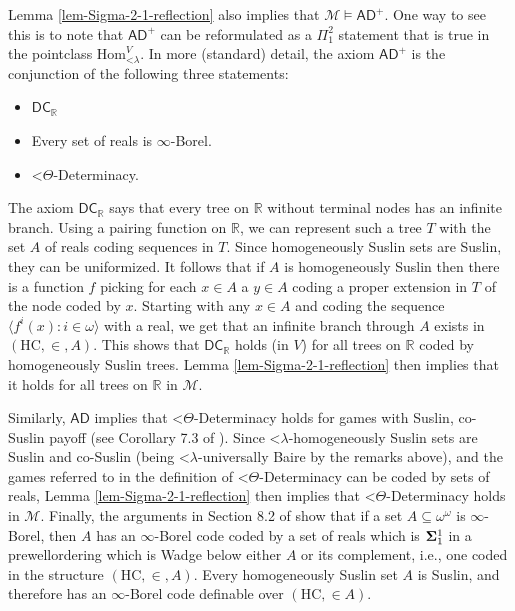 \documentclass[fleqn, 11pt]{amsart}
\theoremstyle{plain}
\theoremstyle{definition}
\theoremstyle{remark}
\newcommand{\Hom}{\mathrm{Hom}}
\newcommand{\HC}{\mathrm{HC}}
\newcommand{\bbR}{\mathbb{R}}
\newcommand{\AD}{\mathsf{AD}}
\newcommand{\DC}{\mathsf{DC}}
\newcommand{\less}{\mathord{<}}
\begin{document}
Lemma \ref{lem-Sigma-2-1-reflection} also implies that $\mathcal{M} \models \AD^{+}$. One way to see this is to note that  $\mathsf{AD}^+$ can be reformulated as a $\Pi^2_1$ statement that is true in the pointclass $\Hom_{\mathord{<}\lambda}^V$.
In more (standard) detail, the axiom $\AD^{+}$ is the conjunction of the following three statements: 
\begin{itemize}
	\item $\DC_{\bbR}$
	\item Every set of reals is $\infty$-Borel. 
	\item $\less\Theta$-Determinacy. 
\end{itemize}

The axiom $\DC_{\bbR}$ says that every tree on $\bbR$ without terminal nodes has an infinite branch. Using a pairing function on $\bbR$, we can represent such a tree $T$ with the set $A$ of reals coding sequences in $T$. Since homogeneously Suslin sets are Suslin, they can be uniformized. It follows that if $A$ is homogeneously Suslin then there is a function $f$ picking for each $x \in A$ a $y \in A$ coding a proper extension in $T$ of the node coded by $x$.  
Starting with any $x \in A$ and coding the sequence $\langle f^{i}(x) : i \in \omega\rangle$ with a real, we get that an infinite branch through $A$ exists in $(\HC, \in, A)$. This shows that $\DC_{\bbR}$ holds (in $V$) for all trees on $\bbR$ coded by homogeneously Suslin trees. Lemma \ref{lem-Sigma-2-1-reflection} then implies that it holds for all trees on $\bbR$ in $\mathcal{M}$. 

Similarly, $\AD$ implies that $\less\Theta$-Determinacy holds for games with Suslin, co-Suslin payoff (see Corollary 7.3 of \cite{Larson:Extensions}). Since $\less\lambda$-homogeneously Suslin sets are Suslin and co-Suslin (being $\less\lambda$-universally Baire by the remarks above), and the games referred to in the definition of $\less\Theta$-Determinacy can be coded by sets of reals, Lemma \ref{lem-Sigma-2-1-reflection} then implies that $\less\Theta$-Determinacy holds in $\mathcal{M}$. Finally, the arguments in Section 8.2 of \cite{Larson:Extensions} show that if a set $A \subseteq \omega^{\omega}$ is $\infty$-Borel, then $A$ has an $\infty$-Borel code coded by a set of reals which is ${\bf \Sigma}^{1}_{1}$ in a prewellordering which is Wadge below either $A$ or its complement, i.e., one coded in the structure $(\HC, \in, A)$. Every homogeneously Suslin set $A$ is Suslin, and therefore has an $\infty$-Borel code definable over $(\HC, \in A)$. 
\end{document}
